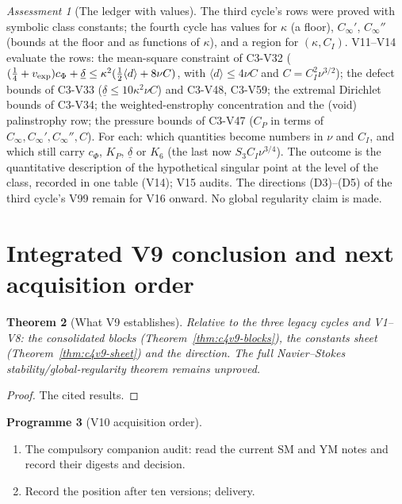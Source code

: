 \documentclass[11pt]{article}
\theoremstyle{plain}
\newtheorem{theorem}{Theorem}[section]
\theoremstyle{definition}
\newtheorem{programme}[theorem]{Programme}
\theoremstyle{remark}
\newtheorem{assessment}[theorem]{Assessment}
\begin{document}
\begin{assessment}[The ledger with values]
\label{ass:c4v9-direction}
The third cycle's rows were proved with symbolic class constants;
the fourth cycle has values for \(\kappa\) (a floor), \(C_\infty'\), \(C_\infty''\) (bounds at
the floor and as functions of \(\kappa\)), and a region for \((\kappa,C_I)\).  V11--V14
evaluate the rows: the mean-square constraint of C3-V32
(\((\frac14+v_{\rm exp})c_\Phi+\underline\delta\le\kappa^2(\frac12\langle d\rangle+8\nu C)\), with \(\langle d\rangle\le4\nu C\) and \(C=C_I^2\nu^{3/2}\)); the
defect bounds of C3-V33 (\(\underline\delta\le10\kappa^2\nu C\)) and C3-V48, C3-V59; the extremal
Dirichlet bounds of C3-V34; the weighted-enstrophy concentration
and the (void) palinstrophy row; the pressure bounds of C3-V47
(\(C_P\) in terms of \(C_\infty,C_\infty',C_\infty'',C\)).  For each: which quantities become
numbers in \(\nu\) and \(C_I\), and which still carry \(c_\Phi\), \(K_P\), \(\underline\delta\) or \(K_6\)
(the last now \(S_3C_I\nu^{3/4}\)).  The outcome is the quantitative description
of the hypothetical singular point at the level of the class,
recorded in one table (V14); V15 audits.  The directions (D3)--(D5)
of the third cycle's V99 remain for V16 onward.  No global
regularity claim is made.
\end{assessment}

\section{Integrated V9 conclusion and next acquisition order}
\label{sec:c4v9-conclusion}

\begin{theorem}[What V9 establishes]
\label{thm:c4v9-conclusion}
Relative to the three legacy cycles and V1--V8: the consolidated
blocks (Theorem~\ref{thm:c4v9-blocks}), the constants sheet
(Theorem~\ref{thm:c4v9-sheet}) and the direction.  The full
Navier--Stokes stability/global-regularity theorem remains
unproved.
\end{theorem}

\begin{proof}
The cited results.
\end{proof}

\begin{programme}[V10 acquisition order]
\label{prog:c4v10}
\begin{enumerate}[label=\textup{(AC\arabic*)},leftmargin=4.8em]
\item The compulsory companion audit: read the current SM and YM
      notes and record their digests and decision.
\item Record the position after ten versions; delivery.
\end{enumerate}
\end{programme}
\end{document}
